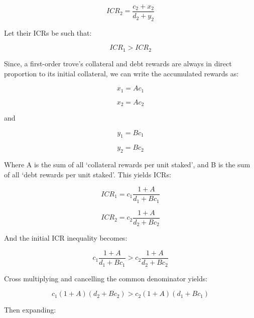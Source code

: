 \documentclass[reqno]{article}
\begin{document}
\begin{equation} 
    ICR_2=\frac{c_2+x_2}{d_2+y_2}
\end{equation}

Let their ICRs be such that:

\begin{equation} 
    ICR_1 > ICR_2
\end{equation}

\bigskip
Since, a first-order trove’s collateral and debt rewards are always in direct proportion to its initial collateral, we can write the accumulated rewards as:

\begin{equation} 
    x_1=Ac_1
\end{equation}

\begin{equation} 
    x_2=Ac_2
\end{equation}

and

\begin{equation} 
    y_1=Bc_1
\end{equation}

\begin{equation} 
    y_2=Bc_2
\end{equation}

\bigskip
Where A is the sum of all ‘collateral rewards per unit staked’, and B is the sum of all ‘debt rewards per unit staked’. This yields ICRs:

\begin{equation} 
    ICR_1=c_1\frac{1+A}{d_1+Bc_1}
\end{equation}

\begin{equation} 
    ICR_2=c_2\frac{1+A}{d_2+Bc_2}
\end{equation}

And the initial ICR inequality becomes:

\begin{equation} 
    c_1\frac{1+A}{d_1+Bc_1}>c_2\frac{1+A}{d_2+Bc_2}
\end{equation}

\bigskip
Cross multiplying and cancelling the common denominator yields:

\begin{equation} 
    c_1\left(1+A\right)\left(d_2+Bc_2\right)>c_2\left(1+A\right)\left(d_1+Bc_1\right)
\end{equation}

Then expanding:
\end{document}
